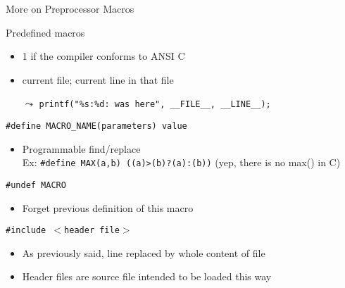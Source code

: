 \begin{frame}{More on Preprocessor Macros}
  \begin{block}{Predefined macros}
    \begin{itemize}
    \item {} 1 if the compiler conforms to ANSI C
    \item {} current file;
       current line in that file
    \item[$\leadsto$] \texttt{printf("\%s:\%d:~was here\n", \_\_FILE\_\_,
      \_\_LINE\_\_);}

    \end{itemize}
  \end{block}
  \begin{block}{\texttt{\#define MACRO\_NAME(parameters) value}}
    \begin{itemize}\vspace{-.5\baselineskip}
    \item  \alert{Programmable find/replace}\\
      Ex: \texttt{\#define MAX(a,b) ((a)>(b)?(a):(b))} (yep, there is no max()
      in C)
    \end{itemize}
  \end{block}
  \begin{block}{\texttt{\#undef MACRO}}
    \begin{itemize}\vspace{-.3\baselineskip}
    \item Forget previous definition of this macro
    \end{itemize}
  \end{block}\vspace{-.3\baselineskip}
  \begin{block}{\texttt{\#include $<$header file$>$}}
    \begin{itemize}\vspace{-.5\baselineskip}
    \item As previously said, line replaced by whole content of file
    \item Header files are source file intended to be loaded this way
    \end{itemize}
  \end{block}
\end{frame}
